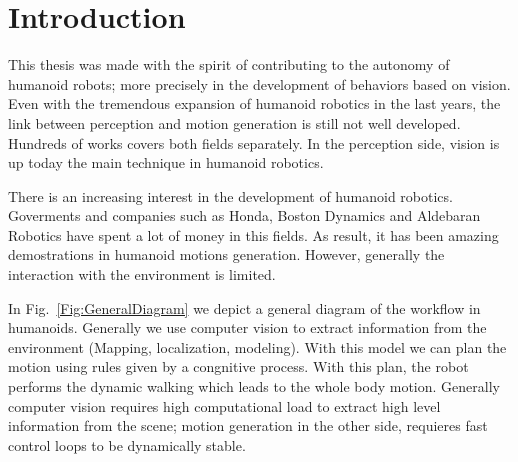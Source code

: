 
\chapter{Introduction} 
\label{Chap:Introduction}

This thesis was made with the spirit of contributing to the autonomy of humanoid robots; more precisely in the development of behaviors based on vision. Even with the tremendous expansion of humanoid robotics in the last years, the link between perception and motion generation is still not well developed. Hundreds of works covers both fields separately. In the perception side, vision is up today the main technique in humanoid robotics. 

There is an increasing interest in the development of humanoid robotics. Goverments and companies such as Honda, Boston Dynamics and Aldebaran Robotics have spent a lot of money in this fields. As result, it has been amazing demostrations in humanoid motions generation. However, generally the interaction with the environment is limited.

In Fig.~\ref{Fig:GeneralDiagram} we depict a general diagram of the workflow in humanoids. Generally we use computer vision to extract information from the environment (Mapping, localization, modeling). With this model we can plan the motion using rules given by a congnitive process. With this plan, the robot performs the dynamic walking which leads to the whole body motion. Generally computer vision requires high computational load to extract high level information from the scene; motion generation in the other side, requieres fast control loops to be dynamically stable. 

